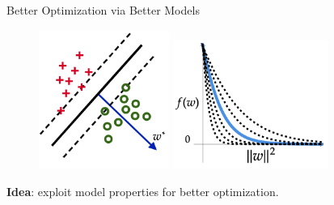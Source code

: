 \documentclass[notheorems]{beamer}
\begin{document}
    \begin{frame}{Better Optimization via Better Models}

        \begin{figure}
            \centering
            \includegraphics[width=0.38\textwidth]{figures/separable}
            \hspace{0.2em}
            \includegraphics[width=0.45\textwidth]{figures/loss_fn}
        \end{figure}
        \vspace{0.2em}

        \begin{center}
            \large \textbf{Idea}: exploit model properties for better optimization.\vspace{0.25em}
        \end{center}


    \end{frame}
\end{document}
